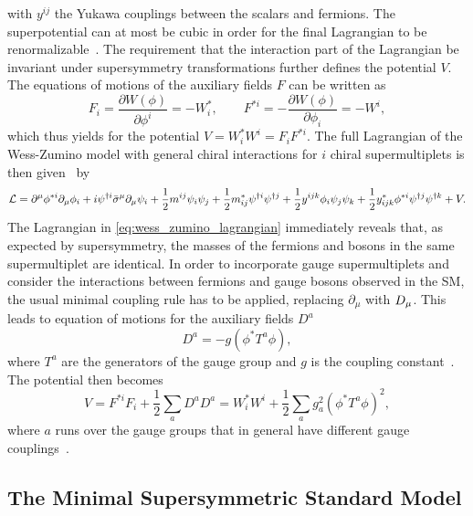 with $y^{ij}$ the Yukawa couplings between the scalars and fermions. The superpotential can at most be cubic in order for the final Lagrangian to be renormalizable~\cite{Bustamante:2009us}. The requirement that the interaction part of the Lagrangian be invariant under supersymmetry transformations further defines the potential $V$. The equations of motions of the auxiliary fields $F$ can be written as
\begin{equation}
	F_i = \frac{\partial W(\phi)}{\partial \phi^i} = - W^*_i, \qquad F^{*i} = - \frac{\partial W(\phi)}{\partial \phi_i} = - W^i,
\end{equation} 
which thus yields for the potential $V = W^*_iW^i = F_iF^{*i}$. The full Lagrangian of the Wess-Zumino model with general chiral interactions for $i$ chiral supermultiplets is then given~\cite{Martin:1997ns} by
\begin{equation}
	\mathcal{L} = \partial^\mu\phi^{*i}\partial_\mu\phi_i + i\psi^{\dagger i}\bar{\sigma}^\mu\partial_\mu\psi_i + \frac{1}{2} m^{ij}\psi_i \psi_j + \frac{1}{2} m_{ij}^* \psi^{\dagger i} \psi^{\dagger j} + \frac{1}{2} y^{ijk} \phi_i \psi_j \psi_k + \frac{1}{2} y^*_{ijk} \phi^{*i} \psi^{\dagger j} \psi^{\dagger k} + V.
	\label{eq:wess_zumino_lagrangian}
\end{equation}
The Lagrangian in \cref{eq:wess_zumino_lagrangian} immediately reveals that, as expected by supersymmetry, the masses of the fermions and bosons in the same supermultiplet are identical. In order to incorporate gauge supermultiplets and consider the interactions between fermions and gauge bosons observed in the SM, the usual minimal coupling rule has to be applied, replacing $\partial_\mu$ with $\mathop{}\!D_\mu$. This leads to equation of motions for the auxiliary fields $D^a$
\begin{equation}
	D^a = -g(\phi^*T^a\phi),
\end{equation}
where $T^a$ are the generators of the gauge group and $g$ is the coupling constant~\cite{Martin:1997ns}. The potential then becomes
\begin{equation}
	V = F^{*i}F_i + \frac{1}{2} \sum_a{D^aD^a} = W^*_iW^i + \frac{1}{2}\sum_a{g^2_a(\phi^*T^a\phi)^2} ,
\end{equation}
where $a$ runs over the gauge groups that in general have different gauge couplings~\cite{Martin:1997ns,Bustamante:2009us}.


 
\subsection{The Minimal Supersymmetric Standard Model}

